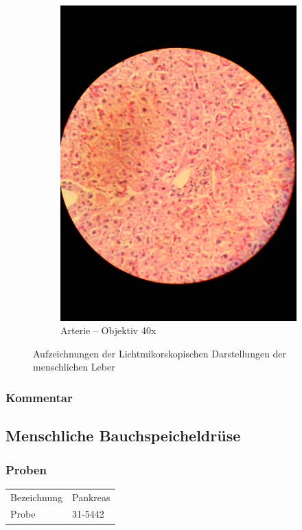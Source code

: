 \begin{figure}[h!]
\begin{subfigure}[b]{0.3\textwidth}
		\includegraphics[width=1\textwidth]{../images/10_human_liver.jpg}
		\caption{Arterie -- Objektiv 40x}
	\end{subfigure}
	\caption{Aufzeichnungen der Lichtmikorskopischen Darstellungen der
		menschlichen Leber}
\end{figure}

\subsubsection{Kommentar}


\newpage
\subsection{Menschliche Bauchspeicheldrüse}

\subsubsection{Proben}
\begin{table}[h!]
	\centering
	\begin{tabular}{l l}
		Bezeichnung	& Pankreas \\
		Probe 		& 31-5442
	\end{tabular}
\end{table}

